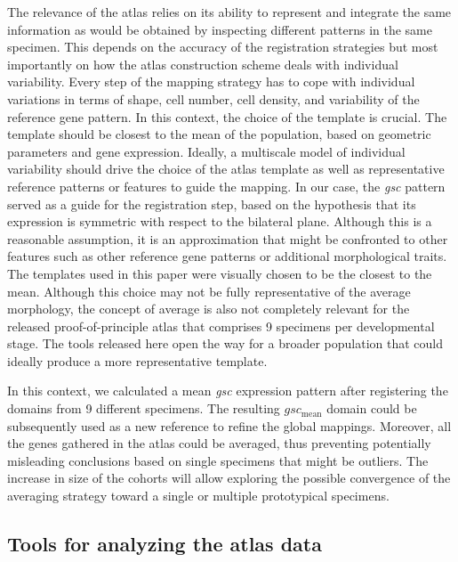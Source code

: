 The relevance of the atlas relies on its ability to represent and integrate the same information as would be obtained by inspecting different patterns in the same specimen. This depends on the accuracy of the registration strategies but most importantly on how the atlas construction scheme deals with individual variability. Every step of the mapping strategy has to cope with individual variations in terms of shape, cell number, cell density, and variability of the reference gene pattern. In this context, the choice of the template is crucial. The template should be closest to the mean of the population, based on geometric parameters and gene expression. Ideally, a multiscale model of individual variability should drive the choice of the atlas template as well as representative reference patterns or features to guide the mapping. In our case, the \emph{gsc} pattern served as a guide for the registration step, based on the hypothesis that its expression is symmetric with respect to the bilateral plane. Although this is a reasonable assumption, it is an approximation that might be confronted to other features such as other reference gene patterns or additional morphological traits. The templates used in this paper were visually chosen to be the closest to the mean. Although this choice may not be fully representative of the average morphology, the concept of average is also not completely relevant for the released proof-of-principle atlas that comprises 9 specimens per developmental stage. The tools released here open the way for a broader population that could ideally produce a more representative template.

In this context, we calculated a mean \emph{gsc} expression pattern after registering the domains from 9 different specimens. The resulting $gsc_\mathrm{mean}$ domain could be subsequently used as a new reference to refine the global mappings. Moreover, all the genes gathered in the atlas could be averaged, thus preventing potentially misleading conclusions based on single specimens that might be outliers. The increase in size of the cohorts will allow exploring the possible convergence of the averaging strategy toward a single or multiple prototypical specimens.

\subsection*{Tools for analyzing the atlas data}

